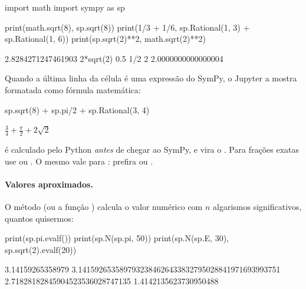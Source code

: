 \begin{entrada}
import math
import sympy as sp

print(math.sqrt(8), sp.sqrt(8))
print(1/3 + 1/6, sp.Rational(1, 3) + sp.Rational(1, 6))
print(sp.sqrt(2)**2, math.sqrt(2)**2)
\end{entrada}
\begin{saida}
2.8284271247461903 2*sqrt(2)
0.5 1/2
2 2.0000000000000004
\end{saida}

Quando a última linha da célula é uma expressão do SymPy, o Jupyter a mostra formatada como fórmula
matemática:

\begin{entrada}
sp.sqrt(8) + sp.pi/2 + sp.Rational(3, 4)
\end{entrada}
\begin{saidamat}
$\displaystyle \frac{3}{4} + \frac{\pi}{2} + 2 \sqrt{2}$
\end{saidamat}

\begin{atencao}
 é calculado pelo Python \emph{antes} de chegar ao SymPy, e vira o  . Para frações
exatas use  ou . O mesmo vale para : prefira
 ou .
\end{atencao}

\paragraph{Valores aproximados.} O método  (ou a função ) calcula o valor
numérico com $n$ algarismos significativos, quantos quisermos:

\begin{entrada}
print(sp.pi.evalf())
print(sp.N(sp.pi, 50))
print(sp.N(sp.E, 30), sp.sqrt(2).evalf(20))
\end{entrada}
\begin{saida}
3.14159265358979
3.1415926535897932384626433832795028841971693993751
2.71828182845904523536028747135 1.4142135623730950488
\end{saida}

